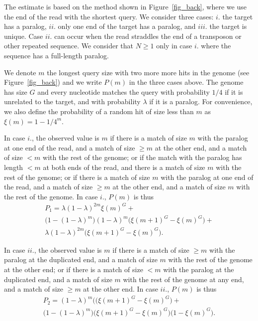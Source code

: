 \documentclass[a4,center,fleqn]{NAR}
\begin{document}
The estimate is based on the method shown in Figure~\ref{fig_back}, where
we use the end of the read with the shortest query. We consider three
cases: $i.$ the target has a paralog, $ii.$ only one end of the target has
a paralog, and $iii.$ the target is unique. Case $ii.$ can occur when the
read straddles the end of a transposon or other repeated sequence. We
consider that $N \geq 1$ only in case $i.$ where the sequence has a
full-length paralog.

We denote $m$ the longest query size with two more more hits in the genome
(see Figure~\ref{fig_back}) and we write $P(m)$ in the three cases above.
The genome has size $G$ and every nucleotide matches the query with
probability $1/4$ if it is unrelated to the target, and with probability
$\lambda$ if it is a paralog. For convenience, we also define the
probability of a random hit of size less than $m$ as $\xi(m) = 1-1/4^m$.

In case $i.$, the observed value is $m$ if there is a match of size $m$
with the paralog at one end of the read, and a match of size $\geq m$ at
the other end, and a match of size $< m$ with the rest of the genome;
or if the match with the paralog has length $< m$ at both ends of the
read, and there is a match of size $m$ with the rest of the genome; or if
there is a match of size $m$ with the paralog at one end of the read, and
a match of size $\geq m$ at the other end, and a match of size $m$ with
the rest of the genome. In case $i.$, $P(m)$ is thus
\begin{align*}
P_1 = \lambda (1-\lambda)^{2m} \xi(m)^G + \\
\big(1-(1-\lambda)^m\big)(1-\lambda)^m \big(\xi(m+1)^G - \xi(m)^G\big) + \\
\lambda (1-\lambda)^{2m} \big(\xi(m+1)^G - \xi(m)^G\big).
\end{align*}

In case $ii.$, the observed value is $m$ if there is a match of size $\geq
m$ with the paralog at the duplicated end, and a match of size $m$ with
the rest of the genome at the other end; or if there is a match of size $<
m$ with the paralog at the duplicated end, and a match of size $m$ with
the rest of the genome at any end, and a match of size $\geq m$ at the
other end. In case $ii.$, $P(m)$ is thus
\begin{align*}
P_2 = (1-\lambda)^m \big((\xi(m+1)^G - \xi(m)^G\big) + \\
\big(1-(1-\lambda)^m\big) \big(\xi(m+1)^G - \xi(m)^G\big)
\big(1 - \xi(m)^G\big).
\end{align*}
\end{document}
